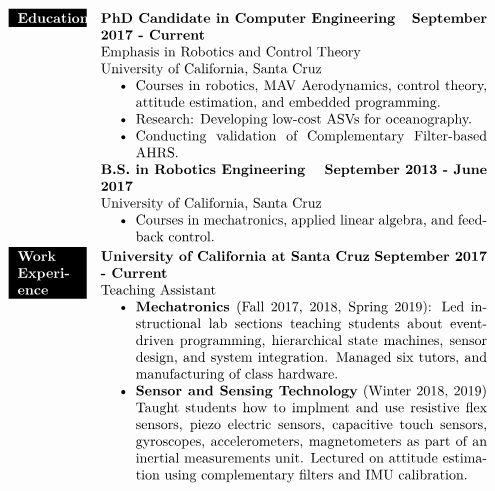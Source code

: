 \documentclass[paper=a4,fontsize=11pt]{article} %
\def \mainColWidth {0.8\textwidth}		%
\def \leftColWidth {0.125\textwidth}		%
\begin{document}
\begin{align*}
		\colorbox{black}{\color{white}{
			\parbox[t]{\leftColWidth}{%
				\textbf{Education}}
			}%
		}
		& &
		\parbox[t]{\mainColWidth}{%
			\textbf{PhD Candidate in Computer Engineering} \hfill \textbf{September 2017 - Current} \\
			Emphasis in Robotics and Control Theory\\
			University of California, Santa Cruz
			\begin{itemize}[noitemsep,topsep=0pt]
			\item Courses in robotics, MAV Aerodynamics, control theory, attitude estimation, and embedded programming.
			\item Research: Developing low-cost ASVs for oceanography. 
			\item Conducting validation of Complementary Filter-based AHRS.
			\end{itemize}
			\textbf{B.S. in Robotics Engineering} \hfill \textbf{September 2013 - June 2017}\\
			University of California, Santa Cruz
			\begin{itemize}[noitemsep,topsep=0pt]
			\item Courses in mechatronics, applied linear algebra, and feedback control.
			\end{itemize}
		}%
	\\
		\colorbox{black}{\color{white}{
				\parbox[t]{\leftColWidth}{%
					\textbf{Work Experience}}
			}%
		}
		& &
		\parbox[t]{\mainColWidth}{%
			\textbf{University of California at Santa Cruz} \hfill \textbf{September 2017 - Current}\\
			\quad Teaching Assistant
			\begin{itemize}[noitemsep,topsep=0pt]
			\item \textbf{Mechatronics} (Fall 2017, 2018, Spring 2019): Led instructional lab sections teaching students about event-driven programming, hierarchical state machines, sensor design, and system integration. Managed six tutors, and manufacturing of class hardware.
			\item \textbf{Sensor and Sensing Technology} (Winter 2018, 2019) Taught students how to implment and use resistive flex sensors, piezo electric sensors, capacitive touch sensors, gyroscopes, accelerometers, magnetometers as part of an inertial measurements unit. Lectured on attitude estimation using complementary filters and IMU calibration.

\end{itemize}}
\end{align*}
\end{document}
